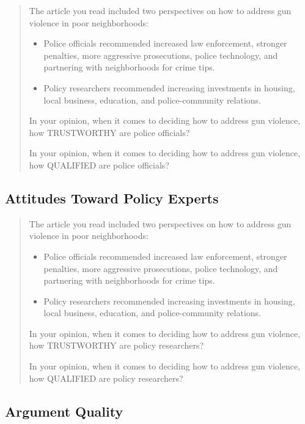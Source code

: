 \documentclass[
]{book}
\providecommand{\tightlist}{%
  \setlength{\itemsep}{0pt}\setlength{\parskip}{0pt}}
\begin{document}
\begin{quote}
The article you read included two perspectives on how to address gun violence in poor neighborhoods:

\begin{itemize}
\tightlist
\item
  Police officials recommended increased law enforcement, stronger penalties, more aggressive prosecutions, police technology, and partnering with neighborhoods for crime tips.
\item
  Policy researchers recommended increasing investments in housing, local business, education, and police-community relations.
\end{itemize}

In your opinion, when it comes to deciding how to address gun violence, how TRUSTWORTHY are police officials?

In your opinion, when it comes to deciding how to address gun violence, how QUALIFIED are police officials?
\end{quote}

\hypertarget{attitudes-toward-policy-experts}{%
\subsection{Attitudes Toward Policy Experts}\label{attitudes-toward-policy-experts}}

\begin{quote}
The article you read included two perspectives on how to address gun violence in poor neighborhoods:

\begin{itemize}
\tightlist
\item
  Police officials recommended increased law enforcement, stronger penalties, more aggressive prosecutions, police technology, and partnering with neighborhoods for crime tips.
\item
  Policy researchers recommended increasing investments in housing, local business, education, and police-community relations.
\end{itemize}

In your opinion, when it comes to deciding how to address gun violence, how TRUSTWORTHY are policy researchers?

In your opinion, when it comes to deciding how to address gun violence, how QUALIFIED are policy researchers?
\end{quote}

\hypertarget{argument-quality}{%
\subsection{Argument Quality}\label{argument-quality}}
\end{document}
